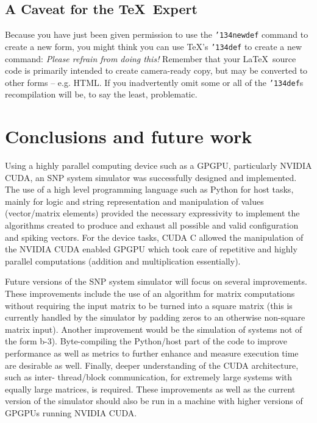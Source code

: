 \documentclass{acm_proc_article-sp}
\begin{document}
\subsection*{A {\secit Caveat} for the \TeX\ Expert}
Because you have just been given permission to
use the \texttt{{\char'134}newdef} command to create a
new form, you might think you can
use \TeX's \texttt{{\char'134}def} to create a
new command: \textit{Please refrain from doing this!}
Remember that your \LaTeX\ source code is primarily intended
to create camera-ready copy, but may be converted
to other forms -- e.g. HTML. If you inadvertently omit
some or all of the \texttt{{\char'134}def}s recompilation will
be, to say the least, problematic.

\section{Conclusions and future work}
Using a highly parallel computing device such as a GPGPU,
particularly NVIDIA CUDA, an SNP system simulator was
successfully designed and implemented. The use of a high
level programming language such as Python for host tasks,
mainly for logic and string representation and manipulation
of values (vector/matrix elements) provided the necessary
expressivity to implement the algorithms created to produce
and exhaust all possible and valid configuration and spiking
vectors. For the device tasks, CUDA C allowed the
manipulation of the NVIDIA CUDA enabled GPGPU which
took care of repetitive and highly parallel computations
(addition and multiplication essentially).

Future versions of the SNP system simulator will focus on
several improvements. These improvements include the use
of an algorithm for matrix computations without requiring
the input matrix to be turned into a square matrix (this is
currently handled by the simulator by padding zeros to an
otherwise non-square matrix input). Another improvement
would be the simulation of systems not of the form b-3).
Byte-compiling the Python/host part of the code to improve
performance as well as metrics to further enhance and
measure execution time are desirable as well. Finally, deeper
understanding of the CUDA architecture, such as inter-
thread/block communication, for extremely large systems
with equally large matrices, is required. These
improvements as well as the current version of the simulator
should also be run in a machine with higher versions of
GPGPUs running NVIDIA CUDA.
\end{document}
